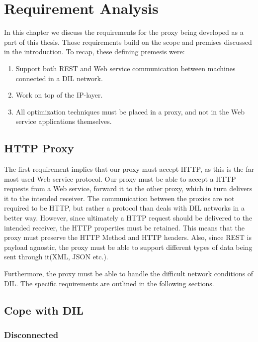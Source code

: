 \chapter{Requirement Analysis}

In this chapter we discuss the requirements for the proxy being developed as a
part of this thesis. Those requirements build on the scope and premises
discussed in the introduction. To recap, these defining premesis were:

\begin{enumerate}
    \item Support both REST and Web service communication between machines connected in a DIL network.
    \item Work on top of the IP-layer.
    \item All optimization techniques must be placed in a proxy, and not in the Web service applications themselves.
\end{enumerate}

\section{HTTP Proxy}

The first requirement implies that our proxy must accept HTTP, as this is the
far most used Web service protocol. Our proxy must be able to accept a HTTP
requests from a Web service, forward it to the other proxy, which in turn
delivers it to the intended receiver. The communication between the proxies are
not required to be HTTP, but rather a protocol than deals with DIL networks in a
better way. However, since ultimately a HTTP request should be delivered to the
intended receiver, the HTTP properties must be retained. This means that the
proxy must preserve the HTTP Method and HTTP headers. Also, since REST is
payload agnostic, the proxy must be able to support different types of data
being sent through it(XML, JSON etc.).

Furthermore, the proxy must be able to handle the difficult network conditions
of DIL. The specific requirements are outlined in the following sections.

\section{Cope with DIL}

\subsection{Disconnected}

